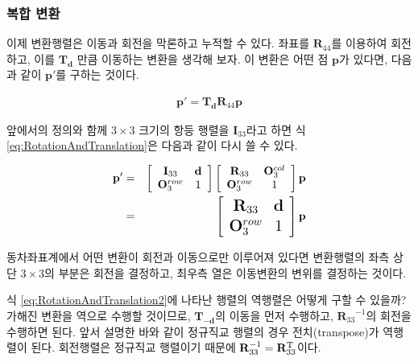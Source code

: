 \subsubsection{복합 변환}

이제 변환행렬은 이동과 회전을 막론하고 누적할 수 있다.
좌표를 $\mathbf R_{44}$를 이용하여 회전하고, 이를 $\mathbf T_{\mathbf d}$ 만큼 이동하는 변환을 생각해 보자.
이 변환은 어떤 점 $\mathbf p$가 있다면, 다음과 같이 $\mathbf p'$를 구하는 것이다.

\begin{eqnarray}
\mathbf p' = \mathbf T_{\mathbf d} \mathbf R_{44}  \mathbf p
\label{eq:RotationAndTranslation}
\end{eqnarray}

앞에서의 정의와 함께 $3 \times 3$ 크기의 항등 행렬을 $\mathbf I_{33}$라고 하면 식 \ref{eq:RotationAndTranslation}은 다음과 같이 
다시 쓸 수 있다.

\begin{eqnarray}
\label{eq:RotationAndTranslation2}
\mathbf p' & = &
\left [
\begin{array}{cc}
\mathbf I_{33} & \mathbf d \\
\mathbf O_3^{row} & 1
\end{array}
\right ]
\left [
\begin{array}{cc}
\mathbf R_{33} & \mathbf O_3^{col} \\
\mathbf O_3^{row} & 1
\end{array}
\right ]
\mathbf p \\ \nonumber
& = &
\Large{
\left [
\begin{array}{cc}
\mathbf R_{33} & \mathbf d \\
\mathbf O_3^{row} & 1
\end{array}
\right ]
\mathbf p}
\end{eqnarray}

동차좌표계에서 어떤 변환이 회전과 이동으로만 이루어져 있다면 변환행렬의 좌측 상단 $3 \times 3$의 부분은 회전을 결정하고,
최우측 열은 이동변환의 변위를 결정하는 것이다.

식 \ref{eq:RotationAndTranslation2}에 나타난 행렬의 역행렬은 어떻게 구할 수 있을까?
가해진 변환을 역으로 수행할 것이므로, 
$\mathbf T_{-\mathbf d}$의 이동을 먼저 수행하고, ${\mathbf R_{33}}^{-1}$의 회전을 수행하면 된다.
앞서 설명한 바와 같이 정규직교 행렬의 경우 전치(transpose)가 역행렬이 된다. 회전행렬은 정규직교 행렬이기 때문에
$\mathbf R_{33}^{-1} = \mathbf R_{33}^{\rm T}$이다.

